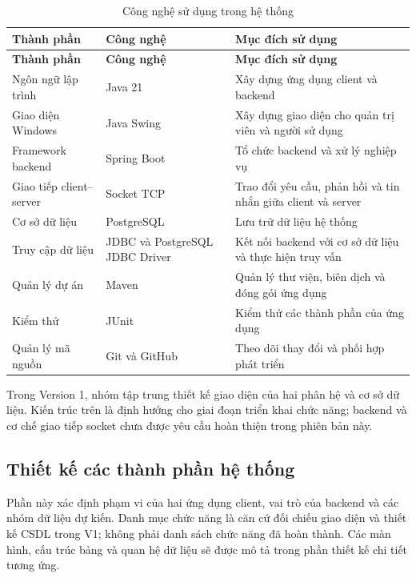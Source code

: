 \begingroup
\small
\begin{longtable}{|L{3.1cm}|L{3.9cm}|L{\dimexpr\textwidth-7cm-6\arrayrulewidth\relax}|}
  \caption{Công nghệ sử dụng trong hệ thống}
  \label{tab:cong-nghe-su-dung}\\
  \hline
  \textbf{Thành phần} & \textbf{Công nghệ} & \textbf{Mục đích sử dụng}\\
  \hline
  \endfirsthead
  \hline
  \textbf{Thành phần} & \textbf{Công nghệ} & \textbf{Mục đích sử dụng}\\
  \hline
  \endhead
  Ngôn ngữ lập trình & Java 21 & Xây dựng ứng dụng client và backend\\
  \hline
  Giao diện Windows & Java Swing & Xây dựng giao diện cho quản trị viên và người sử dụng\\
  \hline
  Framework backend & Spring Boot & Tổ chức backend và xử lý nghiệp vụ\\
  \hline
  Giao tiếp client--server & Socket TCP &
  Trao đổi yêu cầu, phản hồi và tin nhắn giữa client và server\\
  \hline
  Cơ sở dữ liệu & PostgreSQL & Lưu trữ dữ liệu hệ thống\\
  \hline
  Truy cập dữ liệu & JDBC và PostgreSQL JDBC Driver &
  Kết nối backend với cơ sở dữ liệu và thực hiện truy vấn\\
  \hline
  Quản lý dự án & Maven & Quản lý thư viện, biên dịch và đóng gói ứng dụng\\
  \hline
  Kiểm thử & JUnit & Kiểm thử các thành phần của ứng dụng\\
  \hline
  Quản lý mã nguồn & Git và GitHub & Theo dõi thay đổi và phối hợp phát triển\\
  \hline
\end{longtable}
\endgroup

Trong Version 1, nhóm tập trung thiết kế giao diện của hai phân hệ và cơ sở dữ liệu.
Kiến trúc trên là định hướng cho giai đoạn triển khai chức năng; backend và cơ chế
giao tiếp socket chưa được yêu cầu hoàn thiện trong phiên bản này.

\clearpage
\subsection{Thiết kế các thành phần hệ thống}
\label{subsec:thiet-ke-cac-thanh-phan}

Phần này xác định phạm vi của hai ứng dụng client, vai trò của backend
và các nhóm dữ liệu dự kiến. Danh mục chức năng là căn cứ đối chiếu giao diện
và thiết kế CSDL trong V1; không phải danh sách chức năng đã hoàn thành.
Các màn hình, cấu trúc bảng và quan hệ dữ liệu sẽ được mô tả trong phần
thiết kế chi tiết tương ứng.



\clearpage


\clearpage


\clearpage

